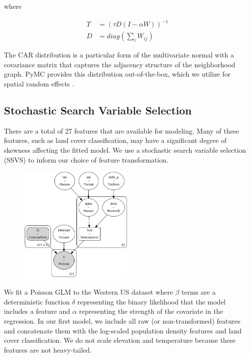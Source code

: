 \documentclass[notitlepage]{article}
\begin{document}
where

\begin{equation}
\begin{aligned}
    T &= (\tau D (I-\alpha W))^{-1} \\
    D &= diag(\sum_{i} W_{ij})
\end{aligned}
\end{equation}


The CAR distribution is a particular form of the multivariate normal with a covariance matrix that captures the adjacency structure of the neighborhood graph. 
PyMC provides this distribution out-of-the-box, which we utilize for spatial random effects \cite{salvatier_probabilistic_2016}.

\subsection{Stochastic Search Variable Selection}

There are a total of 27 features that are available for modeling.
Many of these features, such as land cover classification, may have a significant degree of skewness affecting the fitted model.
We use a stochastic search variable selection (SSVS) to inform our choice of feature transformation.

\begin{figure}[H]
\centering
\includegraphics[width=0.5\textwidth]{report/figures/svss_model.png}
\end{figure}

We fit a Poisson GLM to the Western US dataset where $\beta$ terms are a deterministic function $\delta$ representing the binary likelihood that the model includes a feature and $\alpha$ representing the strength of the covariate in the regression.
In our first model, we include all raw (or non-transformed) features and concatenate them with the log-scaled population density features and land cover classification.
We do not scale elevation and temperature because these features are not heavy-tailed.
\end{document}
